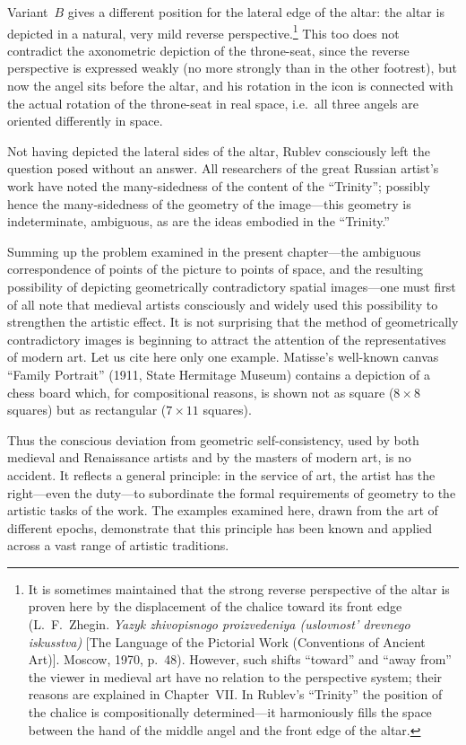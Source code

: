 Variant~$B$ gives a different position for the lateral edge of the altar: the altar is
depicted in a natural, very mild reverse perspective.\footnote{It is sometimes maintained
  that the strong reverse perspective of the altar is proven here by the displacement of
  the chalice toward its front edge (L.~F.~Zhegin.  \emph{Yazyk zhivopisnogo
  proizvedeniya (uslovnost' drevnego iskusstva)} [The Language of the Pictorial Work
  (Conventions of Ancient Art)].  Moscow, 1970, p.~48).  However, such shifts ``toward''
  and ``away from'' the viewer in medieval art have no relation to the perspective system;
  their reasons are explained in Chapter~VII.  In Rublev's ``Trinity'' the position of
  the chalice is compositionally determined---it harmoniously fills the space between the
  hand of the middle angel and the front edge of the altar.}  This too does not contradict
the axonometric depiction of the throne-seat, since the reverse perspective is expressed
weakly (no more strongly than in the other footrest), but now the angel sits before the
altar, and his rotation in the icon is connected with the actual rotation of the throne-seat
in real space, i.e.\ all three angels are oriented differently in space.

Not having depicted the lateral sides of the altar, Rublev consciously left the question
posed without an answer.  All researchers of the great Russian artist's work have noted
the many-sidedness of the content of the ``Trinity''; possibly hence the many-sidedness
of the geometry of the image---this geometry is indeterminate, ambiguous, as are the
ideas embodied in the ``Trinity.''


Summing up the problem examined in the present chapter---the ambiguous correspondence of
points of the picture to points of space, and the resulting possibility of depicting
geometrically contradictory spatial images---one must first of all note that medieval
artists consciously and widely used this possibility to strengthen the artistic effect.
It is not surprising that the method of geometrically contradictory images is beginning
to attract the attention of the representatives of modern art.  Let us cite here only
one example.  Matisse's well-known canvas ``Family Portrait'' (1911, State Hermitage
Museum) contains a depiction of a chess board which, for compositional reasons, is shown
not as square ($8 \times 8$ squares) but as rectangular ($7 \times 11$ squares).


Thus the conscious deviation from geometric self-consistency, used by both medieval and
Renaissance artists and by the masters of modern art, is no accident.  It reflects a
general principle: in the service of art, the artist has the right---even the duty---to
subordinate the formal requirements of geometry to the artistic tasks of the work.  The
examples examined here, drawn from the art of different epochs, demonstrate that this
principle has been known and applied across a vast range of artistic traditions.
